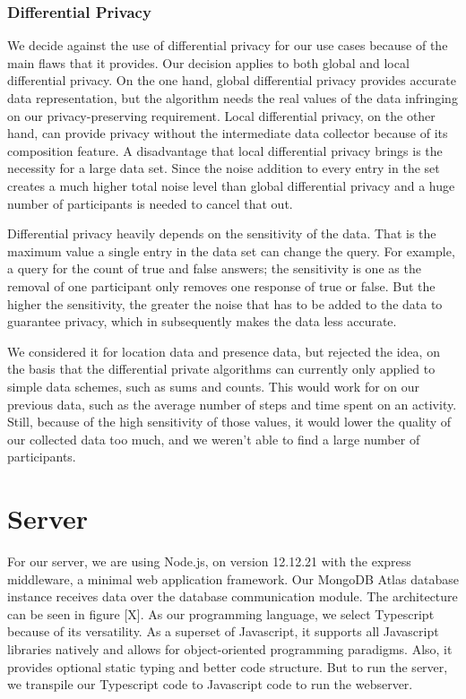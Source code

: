 \subsubsection{Differential Privacy}
We decide against the use of differential privacy for our use cases because of the main flaws that it provides. Our decision applies to both global and local differential privacy. On the one hand, global differential privacy provides accurate data representation, but the algorithm needs the real values of the data infringing on our privacy-preserving requirement. Local differential privacy, on the other hand, can provide privacy without the intermediate data collector because of its composition feature. A disadvantage that local differential privacy brings is the necessity for a large data set. Since the noise addition to every entry in the set creates a much higher total noise level than global differential privacy and a huge number of participants is needed to cancel that out. 

Differential privacy heavily depends on the sensitivity of the data. That is the maximum value a single entry in the data set can change the query. For example, a query for the count of true and false answers; the sensitivity is one as the removal of one participant only removes one response of true or false. But the higher the sensitivity, the greater the noise that has to be added to the data to guarantee privacy, which in subsequently makes the data less accurate.

We considered it for location data and presence data, but rejected the idea, on the basis that the differential private algorithms can currently only applied to simple data schemes, such as sums and counts. This would work for on our previous data, such as the average number of steps and time spent on an activity. Still, because of the high sensitivity of those values, it would lower the quality of our collected data too much, and we weren't able to find a large number of participants.

\section{Server}
For our server, we are using Node.js,
on version 12.12.21 with the express middleware, a minimal web application framework.
Our MongoDB Atlas database instance
receives data over the database communication module. The architecture can be seen in figure [X].
As our programming language, we select Typescript because of its versatility. As a superset of Javascript, it supports all Javascript libraries natively and allows for object-oriented programming paradigms. Also, it provides optional static typing and better code structure. But to run the server, we transpile our Typescript code to Javascript code to run the webserver.

